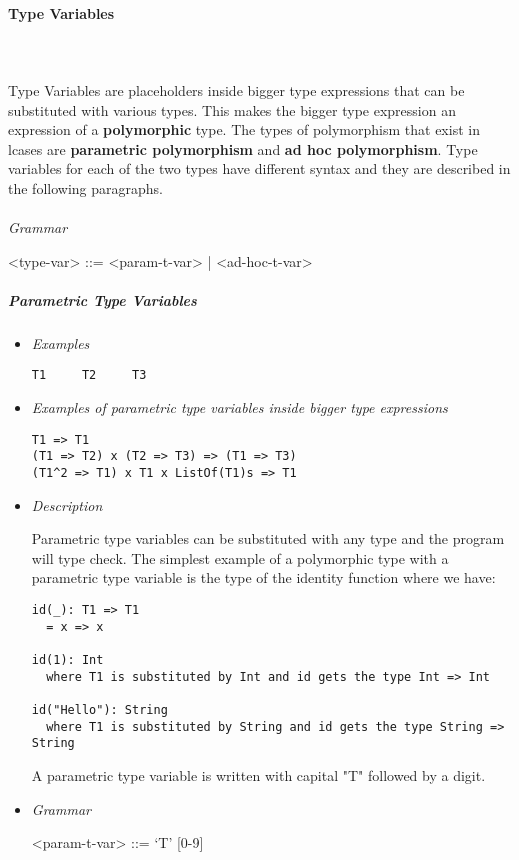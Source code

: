 \documentclass{article}
\begin{document}
\paragraph{Type Variables}
\mbox{}\\\\
Type Variables are placeholders inside bigger type expressions that can be
substituted with various types. This makes the bigger type expression an
expression of a \textbf{polymorphic} type. The types of polymorphism that exist
in lcases are \textbf{parametric polymorphism} and \textbf{ad hoc
polymorphism}. Type variables for each of the two types have different syntax
and they are described in the following paragraphs.
\\\\
\textit{Grammar}
\begin{grammar}
<type-var> ::= <param-t-var> | <ad-hoc-t-var> \\
\end{grammar}
\subparagraph{Parametric Type Variables}

\begin{itemize}
\item \textit{Examples}
\begin{verbatim}
T1     T2     T3
\end{verbatim}

\item
\textit{Examples of parametric type variables inside bigger type expressions}
\begin{verbatim}
T1 => T1
(T1 => T2) x (T2 => T3) => (T1 => T3)
(T1^2 => T1) x T1 x ListOf(T1)s => T1
\end{verbatim}

\item \textit{Description}

Parametric type variables can be substituted with any type and the program will
type check.  The simplest example of a polymorphic type with a parametric type
variable is the type of the identity function where we have:
\begin{verbatim}
id(_): T1 => T1
  = x => x

id(1): Int
  where T1 is substituted by Int and id gets the type Int => Int

id("Hello"): String
  where T1 is substituted by String and id gets the type String => String
\end{verbatim}

A parametric type variable is written with capital "T" followed by a digit.

\item \textit{Grammar}
\begin{grammar}
<param-t-var> ::= `T' [0-9] \\
\end{grammar}
\end{itemize}
\end{document}
